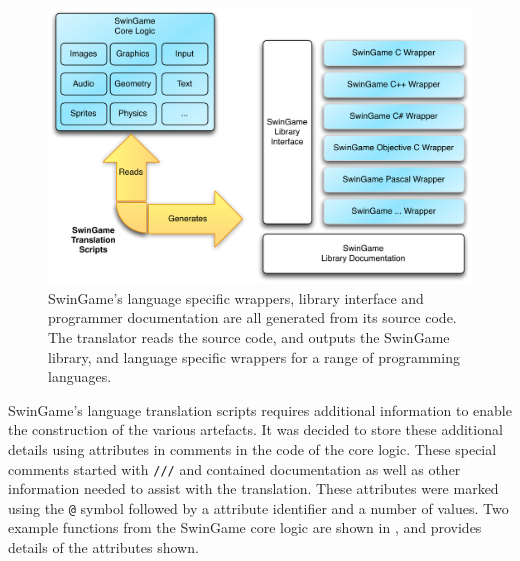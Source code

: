 \begin{figure}[thbp]
  \centering
  \includegraphics[width=\textwidth]{SwinGameTranslator}
  \caption{SwinGame's language specific wrappers, library interface and programmer documentation are all generated from its source code. The translator reads the source code, and outputs the SwinGame library, and language specific wrappers for a range of programming languages.}
  \label{fig:swingame_trans}
\end{figure}

SwinGame's language translation scripts requires additional information to enable the construction of the various artefacts. It was decided to store these additional details using attributes in comments in the code of the core logic. These special comments started with \texttt{///} and contained documentation as well as other information needed to assist with the translation. These attributes were marked using the \texttt{@} symbol followed by a attribute identifier and a number of values. Two example functions from the SwinGame core logic are shown in , and  provides details of the attributes shown.


